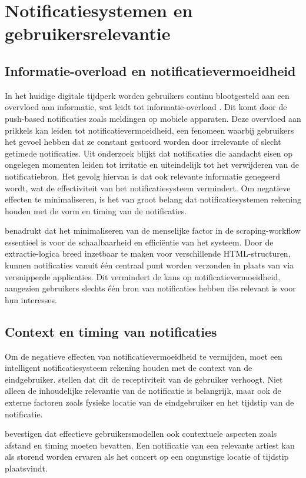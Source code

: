 \section{Notificatiesystemen en gebruikersrelevantie}

\subsection{Informatie-overload en notificatievermoeidheid}

In het huidige digitale tijdperk worden gebruikers continu blootgesteld aan een overvloed aan informatie, wat leidt tot informatie-overload \autocite{NotificationSurvey2017}. Dit komt door de push-based notificaties zoals meldingen op mobiele apparaten. Deze overvloed aan prikkels kan leiden tot notificatievermoeidheid, een fenomeen waarbij gebruikers het gevoel hebben dat ze constant gestoord worden door irrelevante of slecht getimede notificaties. Uit onderzoek blijkt dat notificaties die aandacht eisen op ongelegen momenten leiden tot irritatie en uiteindelijk tot het verwijderen van de notificatiebron. Het gevolg hiervan is dat ook relevante informatie genegeerd wordt, wat de effectiviteit van het notificatiesysteem vermindert. Om negatieve effecten te minimaliseren, is het van groot belang dat notificatiesystemen rekening houden met de vorm en timing van de notificaties. 

\textcite{Lin2021} benadrukt dat het minimaliseren van de menselijke factor in de scraping-workflow essentieel is voor de schaalbaarheid en efficiëntie van het systeem. Door de extractie-logica breed inzetbaar te maken voor verschillende HTML-structuren, kunnen notificaties vanuit één centraal punt worden verzonden in plaats van via versnipperde applicaties. Dit vermindert de kans op notificatievermoeidheid, aangezien gebruikers slechts één bron van notificaties hebben die relevant is voor hun interesses.

\subsection{Context en timing van notificaties}

Om de negatieve effecten van notificatievermoeidheid te vermijden, moet een intelligent notificatiesysteem rekening houden met de context van de eindgebruiker. \textcite{NotificationSurvey2017} stellen dat dit de receptiviteit van de gebruiker verhoogt. Niet alleen de inhoudelijke relevantie van de notificatie is belangrijk, maar ook de externe factoren zoals fysieke locatie van de eindgebruiker en het tijdstip van de notificatie.

\textcite{Zangerle2018} bevestigen dat effectieve gebruikersmodellen ook contextuele aspecten zoals afstand en timing moeten bevatten. Een notificatie van een relevante artiest kan als storend worden ervaren als het concert op een ongunstige locatie of tijdstip plaatsvindt.